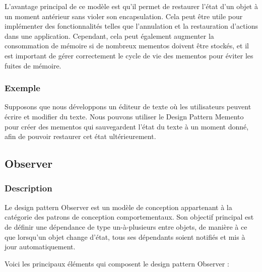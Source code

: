 \documentclass[french]{article}
\begin{document}
L'avantage principal de ce modèle est qu'il permet de restaurer l'état d'un objet à un moment antérieur sans violer son encapsulation. Cela peut être utile pour implémenter des fonctionnalités telles que l'annulation et la restauration d'actions dans une application. Cependant, cela peut également augmenter la consommation de mémoire si de nombreux mementos doivent être stockés, et il est important de gérer correctement le cycle de vie des mementos pour éviter les fuites de mémoire.


\subsubsection{Exemple}

Supposons que nous développons un éditeur de texte où les utilisateurs peuvent écrire et modifier du texte. Nous pouvons utiliser le Design Pattern Memento pour créer des mementos qui sauvegardent l'état du texte à un moment donné, afin de pouvoir restaurer cet état ultérieurement.




\newpage

\subsection{Observer}

\subsubsection{Description}

Le design pattern Observer est un modèle de conception appartenant à la catégorie des patrons de conception comportementaux. Son objectif principal est de définir une dépendance de type un-à-plusieurs entre objets, de manière à ce que lorsqu'un objet change d'état, tous ses dépendants soient notifiés et mis à jour automatiquement.

Voici les principaux éléments qui composent le design pattern Observer :
\end{document}
